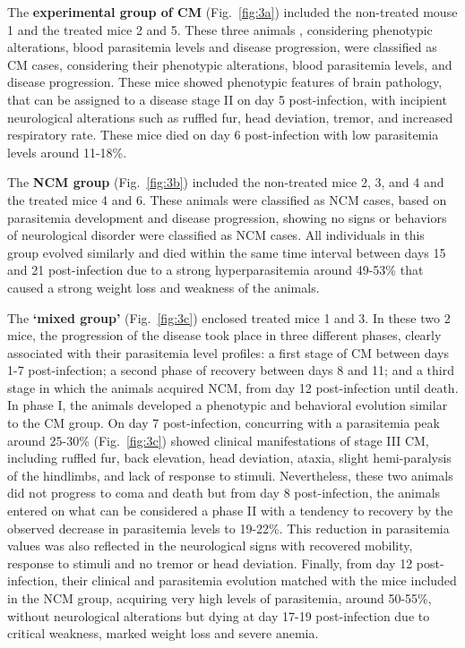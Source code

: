 \documentclass[empirical, authordate]{jote-new-article}
\begin{document}
The \textbf{experimental group of CM }(Fig.~\ref{fig:3a}) included the non-treated mouse 1 and the treated mice 2 and 5. These three animals , considering phenotypic alterations, blood parasitemia levels and disease progression, were classified as CM cases, considering their phenotypic alterations, blood parasitemia levels, and disease progression. These mice showed phenotypic features of brain pathology, that can be assigned to a disease stage II on day 5 post-infection, with incipient neurological alterations such as ruffled fur, head deviation, tremor, and increased respiratory rate. These mice died on day 6 post-infection with low parasitemia levels around 11-18\%.


The \textbf{NCM group} (Fig.~\ref{fig:3b}) included the non-treated mice 2, 3, and 4 and the treated mice 4 and 6. These animals were classified as NCM cases, based on parasitemia development and disease progression, showing no signs or behaviors of neurological disorder were classified as NCM cases. All individuals in this group evolved similarly and died within the same time interval between days 15 and 21 post-infection due to a strong hyperparasitemia around 49-53\% that caused a strong weight loss and weakness of the animals.




The \textbf{`mixed group' }(Fig.~\ref{fig:3c}) enclosed treated mice 1 and 3. In these two 2 mice, the progression of the disease took place in three different phases, clearly associated with their parasitemia level profiles: a first stage of CM between days 1-7 post-infection; a second phase of recovery between days 8 and 11; and a third stage in which the animals acquired NCM, from day 12 post-infection until death. In phase I, the animals developed a phenotypic and behavioral evolution similar to the CM group. On day 7 post-infection, concurring with a parasitemia peak around 25-30\% (Fig.~\ref{fig:3c}) showed clinical manifestations of stage III CM, including ruffled fur, back elevation, head deviation, ataxia, slight hemi-paralysis of the hindlimbs, and lack of response to stimuli. Nevertheless, these two animals did not progress to coma and death but from day 8 post-infection, the animals entered on what can be considered a phase II with a tendency to recovery by the observed decrease in parasitemia levels to 19-22\%. This reduction in parasitemia values was also reflected in the neurological signs with recovered mobility, response to stimuli and no tremor or head deviation. Finally, from day 12 post-infection, their clinical and parasitemia evolution matched with the mice included in the NCM group, acquiring very high levels of parasitemia, around 50-55\%, without neurological alterations but dying at day 17-19 post-infection due to critical weakness, marked weight loss and severe anemia.
\end{document}
